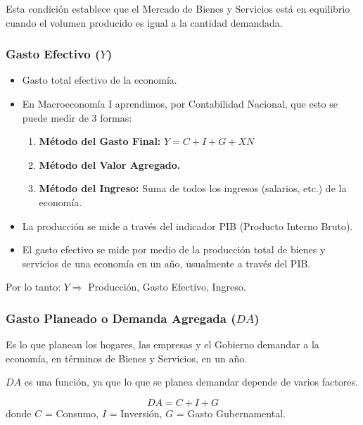 \documentclass[11pt,a4paper]{article}
\begin{document}
Esta condición establece que el Mercado de Bienes y Servicios está en equilibrio cuando el volumen producido es igual a la cantidad demandada.

\subsubsection{Gasto Efectivo ($Y$)}

\begin{itemize}
    \item Gasto total efectivo de la economía.
    \item En Macroeconomía I aprendimos, por Contabilidad Nacional, que esto se puede medir de 3 formas:
    \begin{enumerate}
        \item \textbf{Método del Gasto Final:} $Y = C + I + G + XN$
        \item \textbf{Método del Valor Agregado.}
        \item \textbf{Método del Ingreso:} Suma de todos los ingresos (salarios, etc.) de la economía.
    \end{enumerate}
    \item La producción se mide a través del indicador PIB (Producto Interno Bruto).
    \item El gasto efectivo se mide por medio de la producción total de bienes y servicios de una economía en un año, usualmente a través del PIB.
\end{itemize}

\begin{tcolorbox}[colback=blue!5, colframe=blue!60!black]
Por lo tanto: $Y \Rightarrow$ Producción, Gasto Efectivo, Ingreso.
\end{tcolorbox}

\subsubsection{Gasto Planeado o Demanda Agregada ($DA$)}

Es lo que planean los hogares, las empresas y el Gobierno demandar a la economía, en términos de Bienes y Servicios, en un año.

$DA$ es una función, ya que lo que se planea demandar depende de varios factores.

\begin{resultadobox}
\begin{equation}
    DA = C + I + G \tag{2}
\end{equation}
donde $C$ = Consumo, $I$ = Inversión, $G$ = Gasto Gubernamental.
\end{resultadobox}
\end{document}

